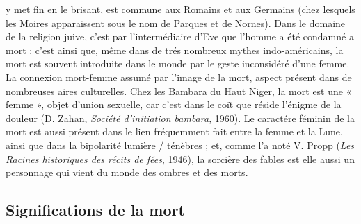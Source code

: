 y met fin en le brisant, est commune aux Romains et aux Germains (chez lesquels les Moires apparaissent sous le nom de Parques et de Nornes). Dans le domaine de la religion juive, c'est par l'intermédiaire d'Eve que l'homme a été condamné a mort : c'est ainsi que, même dans de trés nombreux mythes indo-américains, la mort est souvent introduite dans le monde par le geste inconsidéré d'une femme. La connexion mort-femme assumé par l'image de la mort, aspect présent dans de nombreuses aires culturelles. Chez les Bambara du Haut Niger, la mort est une « femme », objet d'union sexuelle, car c'est dans le coït que réside l'énigme de la douleur (D. Zahan, {\it Société d'initiation bambara}, 1960). Le caractére féminin de la mort est aussi présent dans le lien fréquemment fait entre la femme et la Lune, ainsi que dans la bipolarité lumière / ténèbres ; et, comme l'a noté V. Propp ({\it Les Racines historiques des récits de fées}, 1946), la sorcière des fables est elle aussi un personnage qui vient du monde des ombres et des morts.

\subsection{Significations de la mort}

